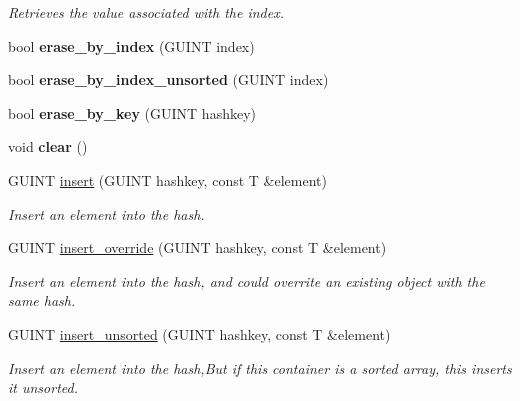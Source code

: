 \begin{DoxyCompactItemize}
\begin{DoxyCompactList}\small\item\em Retrieves the value associated with the index. \end{DoxyCompactList}\item 
\mbox{\label{classgim__hash__table_abd4a9523a14496c9e3eacd7f790dad2c}} 
bool {\bfseries erase\+\_\+by\+\_\+index} (G\+U\+I\+NT index)
\item 
\mbox{\label{classgim__hash__table_a22cce5d8ed58cfb7e16d6b81aaf5acb7}} 
bool {\bfseries erase\+\_\+by\+\_\+index\+\_\+unsorted} (G\+U\+I\+NT index)
\item 
\mbox{\label{classgim__hash__table_a156d142f1eb74c3ef758a14fffe1763a}} 
bool {\bfseries erase\+\_\+by\+\_\+key} (G\+U\+I\+NT hashkey)
\item 
\mbox{\label{classgim__hash__table_a1574ca1850a9258db8b778282134ff42}} 
void {\bfseries clear} ()
\item 
G\+U\+I\+NT \hyperlink{classgim__hash__table_aff0e9bdb5bd6aacf9272db6789c514f7}{insert} (G\+U\+I\+NT hashkey, const T \&element)
\begin{DoxyCompactList}\small\item\em Insert an element into the hash. \end{DoxyCompactList}\item 
G\+U\+I\+NT \hyperlink{classgim__hash__table_a83987136757654921c71b183de8ec55e}{insert\+\_\+override} (G\+U\+I\+NT hashkey, const T \&element)
\begin{DoxyCompactList}\small\item\em Insert an element into the hash, and could overrite an existing object with the same hash. \end{DoxyCompactList}\item 
\mbox{\label{classgim__hash__table_abe9a629ec7dfe612065ed9d161adc7e8}} 
G\+U\+I\+NT \hyperlink{classgim__hash__table_abe9a629ec7dfe612065ed9d161adc7e8}{insert\+\_\+unsorted} (G\+U\+I\+NT hashkey, const T \&element)
\begin{DoxyCompactList}\small\item\em Insert an element into the hash,But if this container is a sorted array, this inserts it unsorted. \end{DoxyCompactList}\item 

\end{DoxyCompactItemize}
